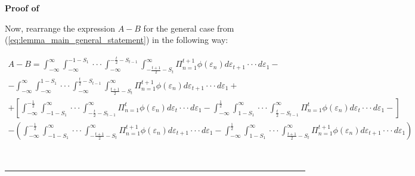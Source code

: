 \documentclass[12pt]{article}
\newenvironment{proof}[1][Proof of]{\noindent\textbf{#1} }{\ \rule{0.5em}{0.5em}}
\begin{document}
\begin{proof}
\begin{enumerate}[label={\roman*})]

Now, rearrange the expression $A-B$ for the general case from (\ref{eq:lemma_main_general_statement}) in the following way:

\tiny
\begin{equation}\label{eq:lemma_main_general_statement_2}
\begin{aligned}
A-B = 
\int_{-\infty}^{\infty}\int_{-\infty}^{-1-S_1} \cdot\cdot\cdot \int_{-\infty}^{-\frac{t}{2}-S_{t-1}}\int^{\infty}_{-\frac{t+1}{2}-S_{t}} \Pi_{n=1}^{t+1} \phi(\varepsilon_n) d\varepsilon_{t+1} \cdot \cdot \cdot d \varepsilon_{1} -\\
-
\int_{-\infty}^{\infty}\int_{-\infty}^{1-S_1}  \cdot\cdot\cdot \int_{-\infty}^{\frac{t}{2}-S_{t-1}}\int^{\infty}_{\frac{t+1}{2}-S_{t}} \Pi_{n=1}^{t+1} \phi(\varepsilon_n) d\varepsilon_{t+1} \cdot \cdot \cdot d \varepsilon_{1}  +\\
+
\left[
\int_{-\infty}^{-\frac{1}{2}} \int^{\infty}_{-1-S_1}\cdot\cdot\cdot \int^{\infty}_{-\frac{t}{2}-S_{t-1}} \Pi_{n=1}^{t} \phi(\varepsilon_n) d\varepsilon_{t} \cdot \cdot \cdot d \varepsilon_{1}
- 
\int_{-\infty}^{\frac{1}{2}} \int^{\infty}_{1-S_1}\cdot\cdot\cdot \int^{\infty}_{\frac{t}{2}-S_{t-1}} \Pi_{n=1}^{t} \phi(\varepsilon_n) d\varepsilon_{t} \cdot \cdot \cdot d \varepsilon_{1} - \right] \\
-
\left( 
\int_{-\infty}^{-\frac{1}{2}} \int^{\infty}_{-1-S_1}\cdot\cdot\cdot \int^{\infty}_{-\frac{t+1}{2}-S_{t}} \Pi_{n=1}^{t+1} \phi(\varepsilon_n) d\varepsilon_{t+1} \cdot \cdot \cdot d \varepsilon_{1}
-
\int_{-\infty}^{\frac{1}{2}} \int^{\infty}_{1-S_1}\cdot\cdot\cdot \int^{\infty}_{\frac{t+1}{2}-S_{t}} \Pi_{n=1}^{t+1} \phi(\varepsilon_n) d\varepsilon_{t+1} \cdot \cdot \cdot d \varepsilon_{1}
\right)
\end{aligned}
\end{equation} 
\normalsize


\end{enumerate}
\end{proof}
\end{document}
